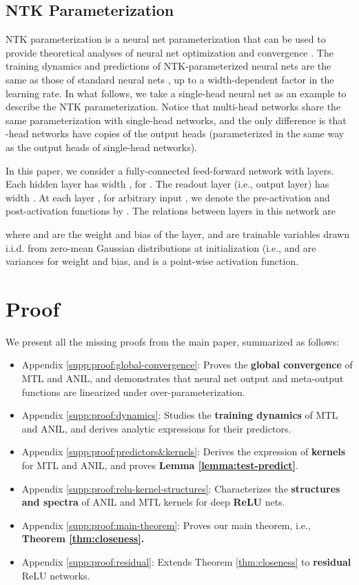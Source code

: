 \documentclass{article}
\begin{document}
\subsection{NTK Parameterization}\label{supp:background:ntk-parameterization}
NTK parameterization is a neural net parameterization that can be used to provide theoretical analyses of neural net optimization and convergence \cite{lee2019wide,xiao2020dis}. The training dynamics and predictions of NTK-parameterized neural nets are the same as those of standard neural nets \cite{lee2019wide}, up to a width-dependent factor in the learning rate. In what follows, we take a single-head neural net as an example to describe the NTK parameterization. Notice that multi-head networks share the same parameterization with single-head networks, and the only difference is that -head networks have  copies of the output heads (parameterized in the same way as the output heads of single-head networks).

In this paper, we consider a fully-connected feed-forward network with 
layers. Each hidden layer has width , for . The readout layer (i.e., output layer) has width . At each layer , for arbitrary input , we denote the pre-activation and post-activation functions by . The relations between layers in this network are

where  and  are the weight and bias of the layer,  and  are trainable variables drawn i.i.d. from zero-mean Gaussian distributions at initialization (i.e.,
 and  are variances for weight and bias, and  is a point-wise activation function.
\section{Proof}\label{supp:proof}
We present all the missing proofs from the main paper, summarized as follows:
\begin{itemize}
    \item Appendix \ref{supp:proof:global-convergence}: Proves the \textbf{global convergence} of MTL and ANIL, and demonstrates that neural net output and meta-output functions are linearized under over-parameterization.
    \item Appendix \ref{supp:proof:dynamics}: Studies the \textbf{training dynamics} of MTL and ANIL, and derives analytic expressions for their predictors.
    \item Appendix \ref{supp:proof:predictors&kernels}: Derives the expression of \textbf{kernels} for MTL and ANIL, and proves \textbf{Lemma \ref{lemma:test-predict}}.
    \item Appendix \ref{supp:proof:relu-kernel-structures}: Characterizes the \textbf{structures and spectra} of ANIL and MTL kernels for deep \textbf{ReLU} nets.
    \item Appendix \ref{supp:proof:main-theorem}: Proves our main theorem, i.e., \textbf{Theorem \ref{thm:closeness}.}
    \item Appendix \ref{supp:proof:residual}: Extends Theorem \ref{thm:closeness} to \textbf{residual} ReLU networks.
\end{itemize}
\end{document}
